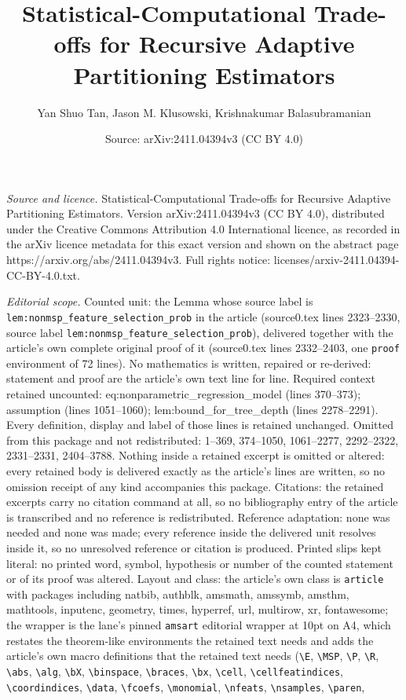 \documentclass[10pt,a4paper]{amsart}
\title[Statistical-Computational Trade-offs for Recursive Adaptive ]{Statistical-Computational Trade-offs for Recursive Adaptive Partitioning Estimators}
\author{Yan Shuo Tan, Jason M. Klusowski, Krishnakumar Balasubramanian}
\date{Source: arXiv:2411.04394v3 (CC BY 4.0)}
\begin{document}
\maketitle

\noindent\emph{Source and licence.} Statistical-Computational Trade-offs for Recursive Adaptive Partitioning Estimators. Version arXiv:2411.04394v3 (CC BY 4.0), distributed under the Creative Commons Attribution 4.0 International licence, as recorded in the arXiv licence metadata for this exact version and shown on the abstract page https://arxiv.org/abs/2411.04394v3. Full rights notice: licenses/arxiv-2411.04394-CC-BY-4.0.txt.\par\smallskip

\noindent\textit{Editorial scope.} Counted unit: the Lemma whose source label is \texttt{lem:nonmsp\_feature\_selection\_prob} in the article (source0.tex lines 2323--2330, source label \texttt{lem:nonmsp\_feature\_selection\_prob}), delivered together with the article's own complete original proof of it (source0.tex lines 2332--2403, one \texttt{proof} environment of 72 lines). No mathematics is written, repaired or re-derived: statement and proof are the article's own text line for line. Required context retained uncounted: eq:nonparametric\_regression\_model (lines 370--373); assumption (lines 1051--1060); lem:bound\_for\_tree\_depth (lines 2278--2291). Every definition, display and label of those lines is retained unchanged. Omitted from this package and not redistributed: 1--369, 374--1050, 1061--2277, 2292--2322, 2331--2331, 2404--3788. Nothing inside a retained excerpt is omitted or altered: every retained body is delivered exactly as the article's lines are written, so no omission receipt of any kind accompanies this package. Citations: the retained excerpts carry no citation command at all, so no bibliography entry of the article is transcribed and no reference is redistributed. Reference adaptation: none was needed and none was made; every reference inside the delivered unit resolves inside it, so no unresolved reference or citation is produced. Printed slips kept literal: no printed word, symbol, hypothesis or number of the counted statement or of its proof was altered. Layout and class: the article's own class is \texttt{article} with packages including natbib, authblk, amsmath, amssymb, amsthm, mathtools, inputenc, geometry, times, hyperref, url, multirow, xr, fontawesome; the wrapper is the lane's pinned \texttt{amsart} editorial wrapper at 10pt on A4, which restates the theorem-like environments the retained text needs and adds the article's own macro definitions that the retained text needs (\texttt{\textbackslash E}, \texttt{\textbackslash MSP}, \texttt{\textbackslash P}, \texttt{\textbackslash R}, \texttt{\textbackslash abs}, \texttt{\textbackslash alg}, \texttt{\textbackslash bX}, \texttt{\textbackslash binspace}, \texttt{\textbackslash braces}, \texttt{\textbackslash bx}, \texttt{\textbackslash cell}, \texttt{\textbackslash cellfeatindices}, \texttt{\textbackslash coordindices}, \texttt{\textbackslash data}, \texttt{\textbackslash fcoefs}, \texttt{\textbackslash monomial}, \texttt{\textbackslash nfeats}, \texttt{\textbackslash nsamples}, \texttt{\textbackslash paren}, 
\end{document}

